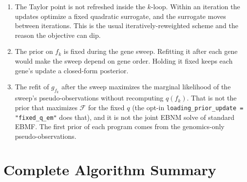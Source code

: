 \documentclass[11pt]{article}
\begin{document}
\begin{keybox}
\begin{enumerate}
  \item The Taylor point is not refreshed inside the $k$-loop. Within an
        iteration the updates optimize a fixed quadratic surrogate, and the
        surrogate moves between iterations. This is the usual
        iteratively-reweighted scheme and the reason the objective can dip.
  \item The prior on $f_k$ is fixed during the gene sweep. Refitting it after
        each gene would make the sweep depend on gene order. Holding it fixed
        keeps each gene's update a closed-form posterior.
  \item The refit of $g_{f_k}$ after the sweep maximizes the marginal likelihood
        of the sweep's pseudo-observations without recomputing $q(f_k)$. That is
        not the prior that maximizes $\mathcal F$ for the fixed $q$ (the opt-in
        \texttt{loading\_prior\_update = "fixed\_q\_em"} does that), and it is not
        the joint EBNM solve of standard EBMF. The first prior of each program
        comes from the genomics-only pseudo-observations.
\end{enumerate}
\end{keybox}

\newpage
\section{Complete Algorithm Summary}\label{sec:algorithm}
\end{document}
